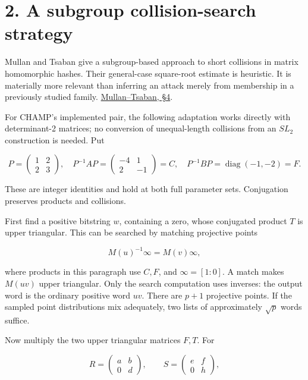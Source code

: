 \documentclass[
  english,
  11pt,
  a4paper,
]{article}
\begin{document}

\section{2. A subgroup collision-search
strategy}\label{a-subgroup-collision-search-strategy}

Mullan and Tsaban give a subgroup-based approach to short collisions in
matrix homomorphic hashes. Their general-case square-root estimate is
heuristic. It is materially more relevant than inferring an attack
merely from membership in a previously studied family.
\href{https://arxiv.org/abs/1306.5646}{Mullan--Tsaban, §4}.


For CHAMP's implemented pair, the following adaptation works directly
with determinant-2 matrices; no conversion of unequal-length collisions
from an \(SL_2\) construction is needed. Put

\[
P=\begin{pmatrix}1&2\\2&3\end{pmatrix},\quad
P^{-1}AP=\begin{pmatrix}-4&1\\2&-1\end{pmatrix}=C,\quad
P^{-1}BP=\operatorname{diag}(-1,-2)=F.
\]

These are integer identities and hold at both full parameter sets.
Conjugation preserves products and collisions.


First find a positive bitstring \(w\), containing a zero, whose
conjugated product \(T\) is upper triangular. This can be searched by
matching projective points

\[
M(u)^{-1}\infty=M(v)\infty,
\]

where products in this paragraph use \(C,F\), and \(\infty=[1:0]\). A
match makes \(M(uv)\) upper triangular. Only the search computation uses
inverses: the output word is the ordinary positive word \(uv\). There
are \(p+1\) projective points. If the sampled point distributions mix
adequately, two lists of approximately \(\sqrt p\) words suffice.


Now multiply the two upper triangular matrices \(F,T\). For

\[
R=\begin{pmatrix}a&b\\0&d\end{pmatrix},\qquad
S=\begin{pmatrix}e&f\\0&h\end{pmatrix},
\]
\end{document}
